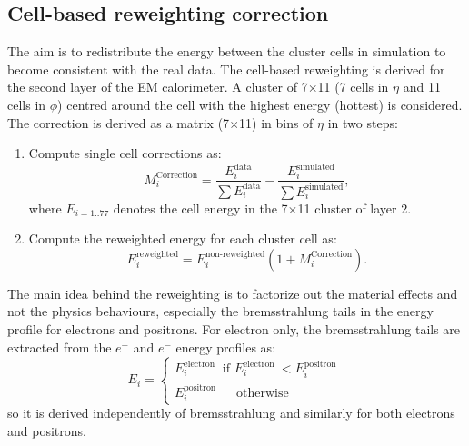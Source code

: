 \subsection{Cell-based reweighting correction}
\label{gamma:ss:reweighting}
The aim is to redistribute the energy between the cluster cells in simulation to become consistent with the real data. The cell-based reweighting is derived for the second layer of the EM calorimeter. A cluster of 7$\times$11 (7 cells in $\eta$ and 11 cells in $\phi$) centred around the cell with the highest energy (hottest) is considered. The correction is derived as a matrix (7$\times$11) in bins of $\eta$ in two steps:
\begin{enumerate}
    \item Compute single cell corrections as: 
    \begin{equation}
        M_{i}^{\text{Correction}} = \frac{E_{i}^{\text{data}}}{\sum E_{i}^{\text{data}}} -  \frac{E_{i}^{\text{simulated}}}{\sum E_{i}^{\text{simulated}}},
    \end{equation}
    where $E_{i = 1 .. 77}$ denotes the cell energy in the 7$\times$11 cluster of layer 2. 
    \item Compute the reweighted energy for each cluster cell as: 
    \begin{equation}
        E_{i}^{\text{reweighted}} = E_{i}^{\text{non-reweighted}}(1+M_{i}^{\text{Correction}}).
    \end{equation}
\end{enumerate}
The main idea behind the reweighting is to factorize out the material effects and not the physics behaviours, especially the bremsstrahlung tails in the energy profile for electrons and positrons. For electron only, the bremsstrahlung tails are extracted from the $e^+$ and $e^-$ energy profiles as: 
\begin{equation}
E_{i}=\left\{\begin{array}{l}
E_{i}^{\text {electron }} \text { if } E_{i}^{\text {electron }}<E_{i}^{\text {positron }} \\
E_{i}^{\text {positron }} \quad \text { otherwise }
\end{array}\right.
\end{equation}
so it is derived independently of bremsstrahlung and similarly for both electrons and positrons.

